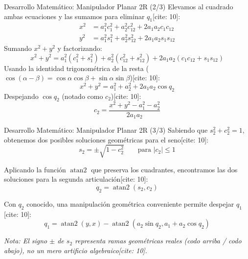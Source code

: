 \documentclass[aspectratio=169, xcolor={table,xcdraw}]{beamer}
\begin{document}
\begin{frame}{Desarrollo Matemático: Manipulador Planar 2R (2/3)}
    Elevamos al cuadrado ambas ecuaciones y las sumamos para eliminar $q_1$[cite: 10]:
    \begin{align*}
        x^2 &= a_1^2 c_1^2 + a_2^2 c_{12}^2 + 2a_1 a_2 c_1 c_{12} \\
        y^2 &= a_1^2 s_1^2 + a_2^2 s_{12}^2 + 2a_1 a_2 s_1 s_{12}
    \end{align*}
    Sumando $x^2 + y^2$ y factorizando:
    \begin{equation*}
        x^2 + y^2 = a_1^2(c_1^2+s_1^2) + a_2^2(c_{12}^2+s_{12}^2) + 2a_1 a_2 (c_1 c_{12} + s_1 s_{12})
    \end{equation*}
    Usando la identidad trigonométrica de la resta ($\cos(\alpha-\beta) = \cos\alpha\cos\beta + \sin\alpha\sin\beta$)[cite: 10]:
    \begin{equation*}
        x^2 + y^2 = a_1^2 + a_2^2 + 2a_1 a_2 \cos q_2
    \end{equation*}
    Despejando $\cos q_2$ (notado como $c_2$)[cite: 10]:
    \begin{equation*}
        \boxed{c_2 = \frac{x^2+y^2-a_1^2-a_2^2}{2a_1 a_2}}
    \end{equation*}
\end{frame}

\begin{frame}{Desarrollo Matemático: Manipulador Planar 2R (3/3)}
    Sabiendo que $s_2^2 + c_2^2 = 1$, obtenemos dos posibles soluciones geométricas para el seno[cite: 10]:
    \begin{equation*}
        \boxed{s_2 = \pm\sqrt{1-c_2^2}} \qquad \text{para } |c_2| \le 1
    \end{equation*}
    
    Aplicando la función $\operatorname{atan2}$ que preserva los cuadrantes, encontramos las dos soluciones para la segunda articulación[cite: 10]:
    \begin{equation*}
        \boxed{q_2 = \operatorname{atan2}(s_2, c_2)}
    \end{equation*}
    
    Con $q_2$ conocido, una manipulación geométrica conveniente permite despejar $q_1$[cite: 10]:
    \begin{equation*}
        \boxed{q_1 = \operatorname{atan2}(y, x) - \operatorname{atan2}(a_2\sin q_2, a_1+a_2\cos q_2)}
    \end{equation*}
    
    \textit{Nota: El signo $\pm$ de $s_2$ representa ramas geométricas reales (codo arriba / codo abajo), no un mero artificio algebraico[cite: 10].}
\end{frame}
\end{document}

